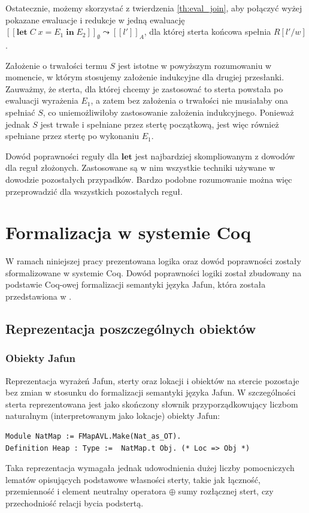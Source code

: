 \documentclass[]{pracamgr}
\renewcommand \| {\hspace{0.75em} | \hspace{0.75em} }
\renewcommand \[ {[\![}
\renewcommand \] {]\!]}
\newcommand \eval [1] {\overset{#1}{\leadsto}}
\theoremstyle{definition}
\newcommand{\jlet}{\mathbf{let}\xspace}
\newcommand{\jin}{\mathbf{in}\xspace}
\newcommand{\letin}[4]{\jlet\; #1\; #2 = #3\; \jin\; #4\xspace}
\begin{document}
Ostatecznie, możemy skorzystać z twierdzenia \ref{th:eval_join}, aby połączyć wyżej pokazane ewaluacje
i redukcje w jedną ewaluację 
$\[ \letin{C}{x}{E_1}{E_2}\]_\emptyset \eval{} \[ l' \]_A$, dla której sterta końcowa spełnia $R[l'/w]$.

Założenie o trwałości termu $S$ jest istotne w powyższym rozumowaniu w momencie, w którym stosujemy
założenie indukcyjne dla drugiej przesłanki. Zauważmy, że sterta, dla której chcemy je zastosować
to sterta powstała po ewaluacji wyrażenia $E_1$, a zatem bez założenia o trwałości nie musiałaby
ona spełniać $S$, co uniemożliwiłoby zastosowanie założenia indukcyjnego.
Ponieważ jednak $S$ jest trwałe i spełniane przez stertę początkową, jest więc również spełniane
przez stertę po wykonaniu $E_1$.

Dowód poprawności reguły dla $\jlet$ jest najbardziej skompliowanym z dowodów dla reguł złożonych.
Zastosowane są w nim wszystkie techniki używane w dowodzie pozostałych przypadków.
Bardzo podobne rozumowanie można więc przeprowadzić dla wszystkich pozostałych reguł.

\chapter{Formalizacja w systemie Coq}
W ramach niniejszej pracy prezentowana logika oraz dowód poprawności zostały
sformalizowane w systemie Coq. Dowód poprawności logiki został zbudowany na podstawie
Coq-owej formalizacji semantyki języka Jafun, która została przedstawiona w \cite{jafun-sem}.

\section{Reprezentacja poszczególnych obiektów}
\subsection{Obiekty Jafun}
Reprezentacja wyrażeń Jafun, sterty oraz lokacji i obiektów na stercie pozostaje
bez zmian w stosunku do formalizacji semantyki języka Jafun.
W szczególności sterta reprezentowana jest jako skończony słownik przyporządkowujący
liczbom naturalnym (interpretowanym jako lokacje) obiekty Jafun:
\begin{verbatim}
Module NatMap := FMapAVL.Make(Nat_as_OT).
Definition Heap : Type :=  NatMap.t Obj. (* Loc => Obj *)
\end{verbatim}
Taka reprezentacja wymagała jednak udowodnienia dużej liczby pomocniczych lematów
opisujących podstawowe własności sterty, takie jak łączność, przemienność i element
neutralny operatora $\oplus$ sumy rozłącznej stert,
czy przechodniość relacji bycia podstertą.
\end{document}
